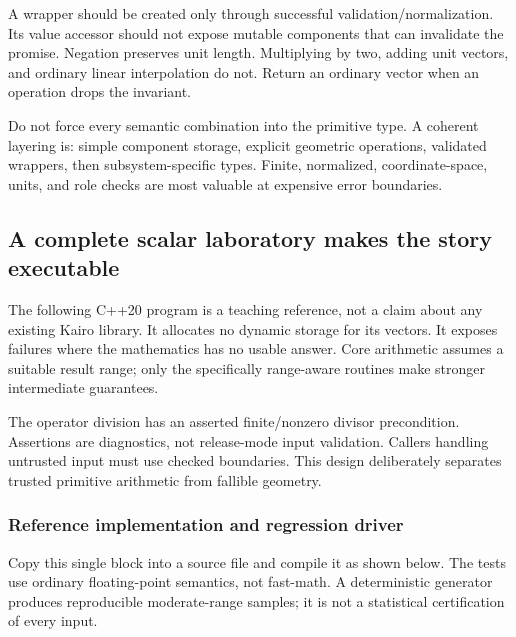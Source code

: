 A  wrapper should be created only through successful validation/normalization. Its value accessor should not expose mutable components that can invalidate the promise. Negation preserves unit length. Multiplying by two, adding unit vectors, and ordinary linear interpolation do not. Return an ordinary vector when an operation drops the invariant.

Do not force every semantic combination into the primitive type. A coherent layering is: simple component storage, explicit geometric operations, validated wrappers, then subsystem-specific types. Finite, normalized, coordinate-space, units, and role checks are most valuable at expensive error boundaries.

\subsection{A complete scalar laboratory makes the story executable}\label{02-foundations-ii-ch037-a-complete-scalar-laboratory-makes-the-story-executable}

\hypertarget{02-foundations-ii-ch037-a-complete-scalar-laboratory-makes-the-story-executable}{}

The following C++20 program is a teaching reference, not a claim about any existing Kairo library. It allocates no dynamic storage for its vectors. It exposes failures where the mathematics has no usable answer. Core arithmetic assumes a suitable result range; only the specifically range-aware routines make stronger intermediate guarantees.

The operator division has an asserted finite/nonzero divisor precondition. Assertions are diagnostics, not release-mode input validation. Callers handling untrusted input must use checked boundaries. This design deliberately separates trusted primitive arithmetic from fallible geometry.

\subsubsection{Reference implementation and regression driver}\label{02-foundations-ii-ch037-reference-implementation-and-regression-driver}

\hypertarget{02-foundations-ii-ch037-reference-implementation-and-regression-driver}{}

Copy this single block into a source file and compile it as shown below. The tests use ordinary floating-point semantics, not fast-math. A deterministic generator produces reproducible moderate-range samples; it is not a statistical certification of every input.


